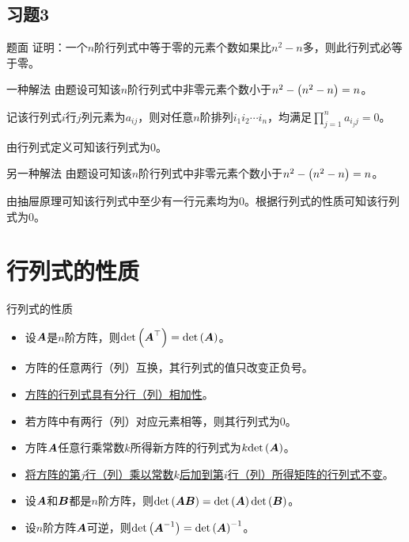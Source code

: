 \documentclass[9pt,xcolor=svgnames]{beamer} %
\begin{document}
\subsection*{习题3}
\begin{frame}
    \begin{block}{题面}
        证明：一个\(n\)阶行列式中等于零的元素个数如果比\(n^2-n\)多，则此行列式必等于零。
    \end{block}
    \pause
    \begin{block}{一种解法}
        由题设可知该\(n\)阶行列式中非零元素个数小于\(n^2-\left( n^2-n \right)=n\)。

        记该行列式\(i\)行\(j\)列元素为\(a_{ij}\)，则对任意\(n\)阶排列\(i_1i_2\cdots i_n\)，均满足\(\prod_{j=1}^{n}a_{i_jj}=0\)。

        由行列式定义可知该行列式为\(0\)。
    \end{block}
    \pause
    \begin{block}{另一种解法}
        由题设可知该\(n\)阶行列式中非零元素个数小于\(n^2-\left( n^2-n \right)=n\)。

        由抽屉原理可知该行列式中至少有一行元素均为\(0\)。根据行列式的性质可知该行列式为\(0\)。
    \end{block}
\end{frame}


\section{行列式的性质}
\begin{frame}{行列式的性质}
    \begin{itemize}
        \item 设\(\boldsymbol{A}\)是\(n\)阶方阵，则\(\mathrm{det}\left( \boldsymbol{A}^\top \right)=\mathrm{det}\left( \boldsymbol{A} \right)\)。
        \item 方阵的任意两行（列）互换，其行列式的值只改变正负号。
        \item \underline{方阵的行列式具有分行（列）相加性}。
        \item 若方阵中有两行（列）对应元素相等，则其行列式为\(0\)。
        \item 方阵\(\boldsymbol{A}\)任意行乘常数\(k\)所得新方阵的行列式为\(k\mathrm{det}\left( \boldsymbol{A} \right)\)。
        \item \underline{将方阵的第\(j\)行（列）乘以常数\(k\)后加到第\(i\)行（列）所得矩阵的行列式不变}。
        \item 设\(\boldsymbol{A}\)和\(\boldsymbol{B}\)都是\(n\)阶方阵，则\(\mathrm{det}\left( \boldsymbol{A}\boldsymbol{B} \right)=\mathrm{det}\left( \boldsymbol{A} \right)\mathrm{det}\left( \boldsymbol{B} \right)\)。
        \item 设\(n\)阶方阵\(\boldsymbol{A}\)可逆，则\(\mathrm{det}\left( {\boldsymbol{A}}^{-1} \right)={\mathrm{det}\left( \boldsymbol{A} \right)}^{-1}\)。
    \end{itemize}
\end{frame}
\end{document}
